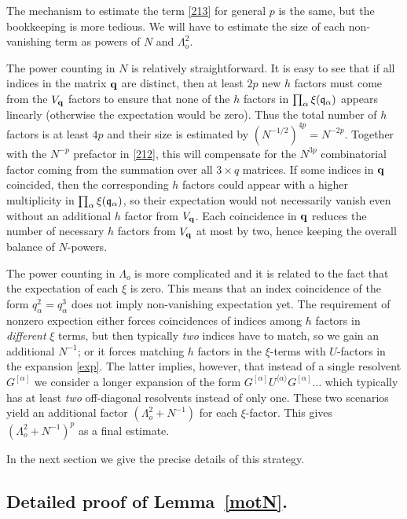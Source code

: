 \documentclass[draft]{article}
\newcommand{\bq}{{\bf {q}}}
\newcommand{\fq}{{\frak q}}
\newcommand{\al}{\alpha}
\numberwithin{equation}{section}
\numberwithin{theorem}{section}
\numberwithin{definition}{section}
\numberwithin{remark}{section}
\begin{document}
\bigskip


The mechanism to estimate the term \eqref{213} for  general $p$
 is the same, but the
bookkeeping is more tedious. We will have to estimate
the size of each non-vanishing term  as powers of $N$ and $\Lambda_o^2$.

The power counting in $N$ is relatively straightforward. It is easy to see 
that if all indices in the matrix $\bq$ are distinct, then
at least $2p$ new $h$ factors must come from the $V_\bq$ factors
to ensure that none of the $h$ factors in $\prod_\al \xi(\fq_\al)$
appears linearly (otherwise the expectation would be zero).
 Thus the total number of $h$ factors is at least $4p$
and their size is estimated by $(N^{-1/2})^{4p} = N^{-2p}$. 
Together with the $N^{-p}$ prefactor in \eqref{212}, this will
compensate for the $N^{3p}$ combinatorial factor coming
from the summation over all $3\times q$ matrices. 
If  some indices in $\bq$ coincided, then the corresponding
$h$ factors could appear with a higher multiplicity 
in $\prod_\al \xi(\fq_\al)$, so their expectation would not necessarily
vanish even without an additional $h$ factor from $V_\bq$.
Each coincidence in $\bq$  reduces the number of necessary $h$ factors from $V_\bq$ 
at most by two, hence keeping the overall balance of $N$-powers.

The power counting in $\Lambda_o$ is more complicated
and it is related to the fact that the expectation
of each $\xi$ is zero. This means that an index coincidence of the form
 $q_\al^2=q_\al^3$ does not imply non-vanishing expectation yet.
The requirement of nonzero expection either forces coincidences
of indices among $h$ factors in {\it different}
$\xi$ terms, but then typically {\it two} indices have to
match, so we gain an additional $N^{-1}$;
 or it forces matching $h$ factors in the $\xi$-terms with
$U$-factors in the expansion \eqref{exp}. The latter implies, however,
that instead of a single resolvent $G^{[\al]}$ we consider
a longer expansion of the form $G^{[\al]} U^{\langle\al\rangle}
 G^{[\al]} \ldots $ which typically has at least {\it two}
off-diagonal resolvents instead of only one. These two scenarios yield an additional factor
$(\Lambda_o^2 +N^{-1})$ for each $\xi$-factor.
This gives $(\Lambda_o^2 +N^{-1})^p$ as a final estimate.

In the next section we give the precise details of this strategy.

\subsection{Detailed proof of Lemma~\ref{motN}.}
\end{document}
